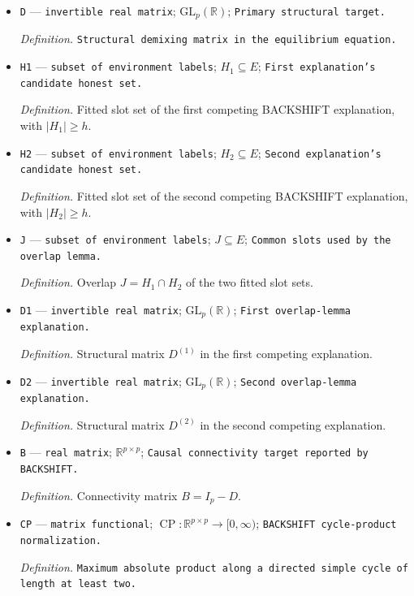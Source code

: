\documentclass{article}
\begin{document}
\begin{itemize}
  \item \texttt{D} --- \texttt{invertible real matrix}; \(\mathrm{GL}_{p}(\mathbb R)\); \texttt{Primary structural target.}
  \par\smallskip\noindent\emph{Definition.} \texttt{Structural demixing matrix in the equilibrium equation.}
  \item \texttt{H1} --- \texttt{subset of environment labels}; \(H_1\subseteq E\); \texttt{First explanation's candidate honest set.}
  \par\smallskip\noindent\emph{Definition.} Fitted slot set of the first competing BACKSHIFT explanation, with \(\lvert H_1\rvert\ge h\).
  \item \texttt{H2} --- \texttt{subset of environment labels}; \(H_2\subseteq E\); \texttt{Second explanation's candidate honest set.}
  \par\smallskip\noindent\emph{Definition.} Fitted slot set of the second competing BACKSHIFT explanation, with \(\lvert H_2\rvert\ge h\).
  \item \texttt{J} --- \texttt{subset of environment labels}; \(J\subseteq E\); \texttt{Common slots used by the overlap lemma.}
  \par\smallskip\noindent\emph{Definition.} Overlap \(J=H_1\cap H_2\) of the two fitted slot sets.
  \item \texttt{D1} --- \texttt{invertible real matrix}; \(\mathrm{GL}_{p}(\mathbb R)\); \texttt{First overlap-\allowbreak{}lemma explanation.}
  \par\smallskip\noindent\emph{Definition.} Structural matrix \(D^{(1)}\) in the first competing explanation.
  \item \texttt{D2} --- \texttt{invertible real matrix}; \(\mathrm{GL}_{p}(\mathbb R)\); \texttt{Second overlap-\allowbreak{}lemma explanation.}
  \par\smallskip\noindent\emph{Definition.} Structural matrix \(D^{(2)}\) in the second competing explanation.
  \item \texttt{B} --- \texttt{real matrix}; \(\mathbb R^{p\times p}\); \texttt{Causal connectivity target reported by BACKSHIFT.}
  \par\smallskip\noindent\emph{Definition.} Connectivity matrix \(B=I_p-D\).
  \item \texttt{CP} --- \texttt{matrix functional}; \(\operatorname{CP}:\mathbb R^{p\times p}\to[0,\infty)\); \texttt{BACKSHIFT cycle-\allowbreak{}product normalization.}
  \par\smallskip\noindent\emph{Definition.} \texttt{Maximum absolute product along a directed simple cycle of length at least two.}

\end{itemize}
\end{document}
